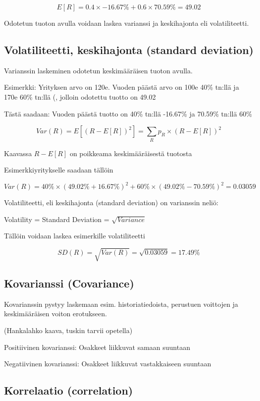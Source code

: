 \documentclass[a4paper]{article}
\begin{document}
\[
E[R] = 0.4 \times -16.67\% + 0.6 \times 70.59\% = 49.02%
\]

Odotetun tuoton avulla voidaan laskea varianssi ja keskihajonta eli volatiliteetti.

\subsection{Volatiliteetti, keskihajonta (standard deviation)}

Varianssin laskeminen odotetun keskimääräisen tuoton avulla.

Esimerkki: Yrityksen arvo on 120e. Vuoden päästä arvo on 100e 40\% tn:llä ja 170e 60\% tn:llä (, jolloin odotettu tuotto on 49.02%

Tästä saadaan: Vuoden päästä tuotto on 40\% tn:llä -16.67\% ja 70.59\% tn:llä 60\%

\[
Var(R) = E[(R - E[R])^2] = \sum_R{p_R \times (R - E[R])^2}
\]

Kaavassa $R - E[R]$ on poikkeama keskimääräisestä tuotosta

Esimerkkiyritykselle saadaan tällöin

\[
Var(R) = 40\% \times (49.02\% + 16.67\%)^2 + 60\% \times (49.02\% - 70.59\%)^2 = 0.03059
\]

Volatiliteetti, eli keskihajonta (standard deviation) on varianssin neliö:

Volatility = Standard Deviation = $\sqrt{Variance}$

Tällöin voidaan laskea esimerkille volatiliteetti

\[
SD(R) = \sqrt{Var(R)} = \sqrt{0.03059} = 17.49\%
\]

\subsection{Kovarianssi (Covariance)}

Kovarianssin pystyy laskemaan esim. historiatiedoista, perustuen voittojen ja keskimääräisen voiton erotukseen.

(Hankalahko kaava, tuskin tarvii opetella)

Positiivinen kovarianssi: Osakkeet liikkuvat samaan suuntaan

Negatiivinen kovarianssi: Osakkeet liikkuvat vastakkaiseen suuntaan

\subsection{Korrelaatio (correlation)}
\end{document}
